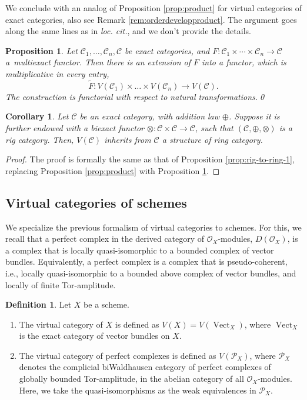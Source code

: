 \documentclass[11pt]{article}
\providecommand{\loccit}{\emph{loc. cit.}}
\newcommand{\ie}{i.e.,\xspace}
\theoremstyle{plain}
\newtheorem{proposition}[theorem]{Proposition}
\newtheorem{corollary}[theorem]{Corollary}
\theoremstyle{definition}
\newtheorem{definition}[theorem]{Definition}
\newcommand{\Ccal}{\mathcal C}
\newcommand{\Ocal}{\mathcal O}
\newcommand{\Pcal}{\mathcal P}
\DeclareMathOperator{\Vect}{Vect}
\begin{document}
We conclude with an analog of Proposition \ref{prop:product} for virtual categories of exact categories, also see Remark \ref{rem:orderdevelopproduct}. The argument goes along the same lines as in \loccit, and we don't provide the details.
\begin{proposition}\label{prop:product-virtual}
Let $\Ccal_{1},\ldots,\Ccal_{n},\Ccal$ be exact categories, and \hbox{$F\colon \Ccal_{1}\!\times\!\cdots\!\times\!\Ccal_{n}\!\to\!\Ccal$} a~multiexact functor. Then there is an extension of $F$ into a functor, which is multiplicative in every entry,
\begin{displaymath}
\widetilde{F}\colon V(\Ccal_{1})\times\ldots \times V(\Ccal_{n})\to V(\Ccal).
\end{displaymath}
The construction is functorial with respect to natural transformations.\qed
\end{proposition}

\begin{corollary}\label{cor:product-virtual}
Let $\Ccal$ be an exact category, with addition law $\oplus$. Suppose it is further endowed with a biexact functor $\otimes\colon\Ccal\times\Ccal\to\Ccal$, such that $(\Ccal,\oplus,\otimes)$ is a rig category. Then, $V(\Ccal)$ inherits from $\Ccal$ a structure of ring category.
\end{corollary}
\begin{proof}
The proof is formally the same as that of Proposition \ref{prop:rig-to-ring-1}, replacing Proposition \ref{prop:product} with Proposition \ref{prop:product-virtual}.
\end{proof}

\subsection{Virtual categories of schemes}\label{sec:virtual-schemes}
We specialize the previous formalism of virtual categories to schemes. For this, we recall that a perfect complex in the derived category of $\Ocal_X$-modules, $D(\Ocal_X)$, is a complex that is locally quasi-isomorphic to a bounded complex of vector bundles. Equivalently, a perfect complex is a complex that is pseudo-coherent, \ie locally quasi-isomorphic to a bounded above complex of vector bundles, and locally of finite Tor-amplitude.

\begin{definition}\label{def:virtual-category-perfect}
Let $X$ be a scheme.
\begin{enumerate}
\item The virtual category of $X$ is defined as $V(X) = V(\Vect_X)$, where $\Vect_{X}$ is the exact category of vector bundles on $X$.

\item The virtual category of perfect complexes is defined as $V(\Pcal_X)$, where $\Pcal_X$ denotes the complicial biWaldhausen category of perfect complexes of globally bounded Tor-amplitude, in the abelian category of all $\Ocal_X$-modules. Here, we take the quasi-isomorphisms as the weak equivalences in $\Pcal_{X}$.
\end{enumerate}
\end{definition}
\end{document}
